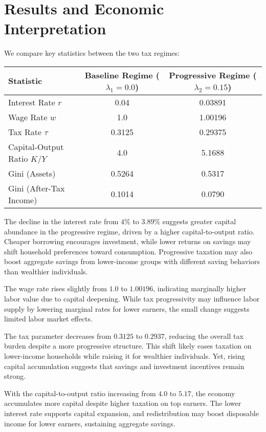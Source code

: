 \documentclass{article}
\begin{document}
\section{Results and Economic Interpretation}

We compare key statistics between the two tax regimes:

\begin{center}
\begin{tabular}{|l|c|c|}
\hline
Statistic & Baseline Regime ($\lambda_1 = 0.0$) & Progressive Regime ($\lambda_2 = 0.15$) \\
\hline
Interest Rate $r$ & 0.04 & 0.03891 \\
Wage Rate $w$ & 1.0 & 1.00196 \\
Tax Rate $\tau$ & 0.3125 & 0.29375 \\
Capital-Output Ratio $K/Y$ & 4.0 & 5.1688 \\
Gini (Assets) & 0.5264 & 0.5317 \\
Gini (After-Tax Income) & 0.1014 & 0.0790 \\
\hline
\end{tabular}
\end{center}


The decline in the interest rate from \(4\%\) to \(3.89\%\) suggests greater capital abundance in the progressive regime, driven by a higher capital-to-output ratio. Cheaper borrowing encourages investment, while lower returns on savings may shift household preferences toward consumption. Progressive taxation may also boost aggregate savings from lower-income groups with different saving behaviors than wealthier individuals.

The wage rate rises slightly from \(1.0\) to \(1.00196\), indicating marginally higher labor value due to capital deepening. While tax progressivity may influence labor supply by lowering marginal rates for lower earners, the small change suggests limited labor market effects.

The tax parameter decreases from \(0.3125\) to \(0.2937\), reducing the overall tax burden despite a more progressive structure. This shift likely eases taxation on lower-income households while raising it for wealthier individuals. Yet, rising capital accumulation suggests that savings and investment incentives remain strong.

With the capital-to-output ratio increasing from \(4.0\) to \(5.17\), the economy accumulates more capital despite higher taxation on top earners. The lower interest rate supports capital expansion, and redistribution may boost disposable income for lower earners, sustaining aggregate savings.
\end{document}
